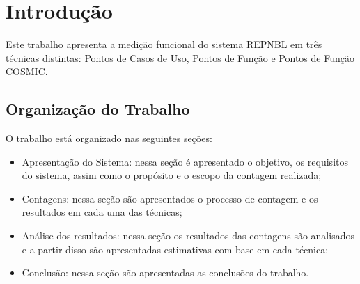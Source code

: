 \chapter[Introdução]{Introdução}

Este trabalho apresenta a medição funcional do sistema REPNBL em três técnicas distintas:
Pontos de Casos de Uso, Pontos de Função e Pontos de Função COSMIC.

\section{Organização do Trabalho}

O trabalho está organizado nas seguintes seções:

\begin{itemize}
 
  \item{Apresentação do Sistema:} nessa seção é apresentado o objetivo, os requisitos do sistema, assim como o propósito e o escopo da contagem realizada;

  \item{Contagens:} nessa seção são apresentados o processo de contagem e os resultados em cada uma das técnicas;

  \item{Análise dos resultados:} nessa seção os resultados das contagens são analisados e a partir disso são apresentadas estimativas com base em cada técnica;

  \item{Conclusão:} nessa seção são apresentadas as conclusões do trabalho.

\end{itemize}